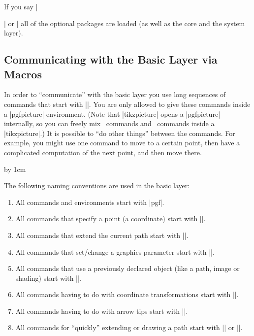 If you say |\usepackage{pgf}| or | all of the optional
packages are loaded (as well as the core and the system layer).


\subsection{Communicating with the Basic Layer via Macros}

In order to ``communicate'' with the basic layer you use long
sequences of commands that start with |\pgf|. You are only allowed to
give these commands inside a |{pgfpicture}| environment. (Note that
|{tikzpicture}| opens a |{pgfpicture}| internally, so you can freely
mix \pgfname\ commands and \tikzname\ commands inside a
|{tikzpicture}|.) It is possible to ``do other things'' between the
commands. For example, you might use one command to move to a certain
point, then have a complicated computation of the next point, and then
move there. 

\begin{codeexample}[]
\newdimen\myypos
\begin{pgfpicture}
  \pgfpathmoveto{\pgfpoint{0cm}{\myypos}}
  \pgfpathlineto{\pgfpoint{1cm}{\myypos}}
  \advance \myypos by 1cm
  \pgfpathlineto{\pgfpoint{1cm}{\myypos}}
  \pgfpathclose
\end{pgfpicture}
\end{codeexample}

The following naming conventions are used in the basic layer:

\begin{enumerate}
\item
  All commands and environments start with |pgf|.
\item
  All commands that specify a point (a coordinate) start with |\pgfpoint|.
\item
  All commands that extend the current path start with |\pgfpath|.
\item
  All commands that set/change a graphics parameter start with |\pgfset|.
\item
  All commands that use a previously declared object (like a path,
  image or shading) start with |\pgfuse|.
\item
  All commands having to do with coordinate transformations start with
  |\pgftransform|. 
\item
  All commands having to do with arrow tips start with |\pgfarrows|.
\item
  All commands for ``quickly'' extending or drawing a path start with
  |\pgfpathq| or |\pgfusepathq|.
\end{enumerate}


